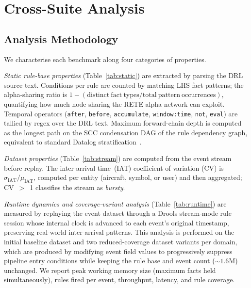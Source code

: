 
\section{Cross-Suite Analysis}\label{sec:analysis}

\subsection{Analysis Methodology}\label{sec:metrics}

We characterise each benchmark along four categories of properties.

\emph{Static rule-base properties} (Table~\ref{tab:static}) are extracted by parsing the DRL source text.
Conditions per rule are counted by matching LHS fact patterns; the alpha-sharing ratio is
$1 - (\mathrm{distinct\ fact\ types} / \mathrm{total\ pattern\ occurrences})$, quantifying how much
node sharing the RETE alpha network can exploit.
Temporal operators (\texttt{after}, \texttt{before}, \texttt{accumulate}, \texttt{window:time},
\texttt{not}, \texttt{eval}) are tallied by regex over the DRL text.
Maximum forward-chain depth is computed as the longest path on the SCC condensation DAG of the
rule dependency graph, equivalent to standard Datalog stratification~\cite{ullman1989}.

\emph{Dataset properties} (Table~\ref{tab:stream}) are computed from the event stream before replay.
The inter-arrival time~(IAT) coefficient of variation (CV) is $\sigma_{\mathrm{IAT}} / \mu_{\mathrm{IAT}}$,
computed per entity (aircraft, symbol, or user) and then aggregated; CV~$>$~1 classifies the
stream as \emph{bursty}.

\emph{Runtime dynamics and coverage-variant analysis} (Table~\ref{tab:runtime}) are measured by replaying the event dataset through a Drools stream-mode rule session whose internal clock is advanced to each event's original timestamp, preserving real-world inter-arrival patterns. This analysis is performed on the initial baseline dataset and two reduced-coverage dataset variants per domain, which are produced by modifying event field values to progressively suppress pipeline entry conditions while keeping the rule base and event count (${\sim}1.6$M) unchanged. We report peak working memory size (maximum facts held simultaneously), rules fired per event, throughput, latency, and rule coverage.

